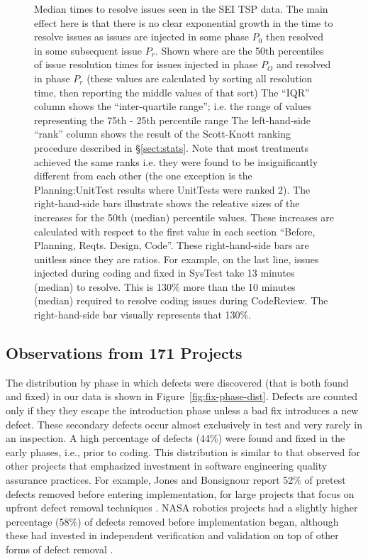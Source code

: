 \documentclass[smallcondensed]{svjour3}
\newcommand{\tion}[1]{\S\ref{sect:#1}}
\begin{document}
\begin{figure}
\begin{center}
\end{center}
\caption{Median times to resolve issues seen in the SEI TSP data. The main effect here is that there is no clear exponential growth in the time to resolve issues as issues are injected in some phase $P_0$ then resolved in some subsequent issue $P_r$.
Shown where are the 50th percentiles of issue resolution times for issues injected in phase $P_O$ and resolved in phase $P_r$ (these values are calculated
by sorting all resolution time, then reporting the middle values of that sort)
The ``IQR'' column shows the ``inter-quartile range''; i.e. the range of values representing the 75th - 25th percentile range
The left-hand-side ``rank'' column shows the result of the Scott-Knott ranking procedure described in \tion{stats}. Note that
most treatments achieved the same ranks i.e. they were found to be insignificantly different  from each other (the one exception is the Planning:UnitTest results 
where UnitTests were ranked 2).
The right-hand-side bars
illustrate shows the releative sizes of the increases for the  50th (median)   percentile values. These increases are calculated with respect to the first value in each section ``Before, Planning, Reqts. Design, Code''.
These right-hand-side bars are unitless since they are ratios. For example,
on the last line, issues injected during coding and fixed in SysTest take 13 minutes (median) to resolve. This is 130\% more than the 10 minutes (median) required
to resolve coding issues during CodeReview. The right-hand-side bar visually represents that 130\%.}
\label{fig:raw}
\end{figure}
 
 
\subsection{Observations from 171 Projects}\label{sect:171projects}

The distribution by phase in which defects were discovered (that is both found and fixed) in our data is shown in Figure~\ref{fig:fix-phase-dist}. Defects are counted only if they they escape the introduction phase unless a bad fix introduces a new defect.  These secondary defects occur almost exclusively in test and very rarely in an inspection. 
A high percentage of defects (44\%) were found and fixed in the early phases, i.e., prior to coding. This distribution is similar to that observed for other projects that emphasized investment in software engineering quality assurance practices. For example, Jones and Bonsignour report 52\% of pretest defects removed before entering implementation, for large projects that focus on upfront defect removal techniques \cite{jones12}. NASA robotics projects had a slightly higher percentage (58\%) of defects removed before implementation began, although these had invested in independent verification and validation on top of other forms of defect removal \cite{me08a}.  
\end{document}
